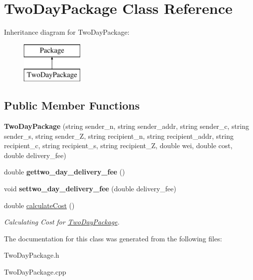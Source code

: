 \hypertarget{class_two_day_package}{}\section{Two\+Day\+Package Class Reference}
\label{class_two_day_package}
Inheritance diagram for Two\+Day\+Package\+:\begin{figure}[H]
\begin{center}
\leavevmode
\includegraphics[height=2.000000cm]{class_two_day_package}
\end{center}
\end{figure}
\subsection*{Public Member Functions}
\begin{DoxyCompactItemize}
\item 
\mbox{\label{class_two_day_package_a95838cf123fb1e9706a957cf049c5e25}} 
{\bfseries Two\+Day\+Package} (string sender\+\_\+n, string sender\+\_\+addr, string sender\+\_\+c, string sender\+\_\+s, string sender\+\_\+Z, string recipient\+\_\+n, string recipient\+\_\+addr, string recipient\+\_\+c, string recipient\+\_\+s, string recipient\+\_\+Z, double wei, double cost, double delivery\+\_\+fee)
\item 
\mbox{\label{class_two_day_package_a8f794e7e88e802b0b7089174e430cd96}} 
double {\bfseries gettwo\+\_\+day\+\_\+delivery\+\_\+fee} ()
\item 
\mbox{\label{class_two_day_package_a6c5cb416afb7558e1eb2a6a709d44ead}} 
void {\bfseries settwo\+\_\+day\+\_\+delivery\+\_\+fee} (double delivery\+\_\+fee)
\item 
\mbox{\label{class_two_day_package_ac87bb9d651b859d1049a003b6659037c}} 
double \mbox{\hyperlink{class_two_day_package_ac87bb9d651b859d1049a003b6659037c}{calculate\+Cost}} ()
\begin{DoxyCompactList}\small\item\em Calculating Cost for \mbox{\hyperlink{class_two_day_package}{Two\+Day\+Package}}. \end{DoxyCompactList}\end{DoxyCompactItemize}


The documentation for this class was generated from the following files\+:\begin{DoxyCompactItemize}
\item 
Two\+Day\+Package.\+h\item 
Two\+Day\+Package.\+cpp\end{DoxyCompactItemize}
